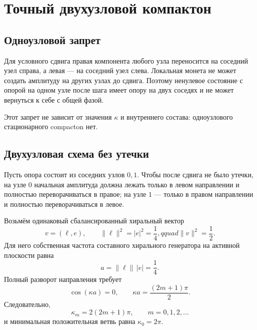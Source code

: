 \chapter{Точный двухузловой компактон}
\label{ch:v6-spectral-transition-discrete-compacton-existence-gate}

\section{Одноузловой запрет}

Для условного сдвига правая компонента любого узла переносится на соседний
узел справа, а левая --- на соседний узел слева. Локальная монета не может
создать амплитуду на других узлах до сдвига. Поэтому ненулевое состояние с
опорой на одном узле после шага имеет опору на двух соседях и не может
вернуться к себе с общей фазой.

Этот запрет не зависит от значения $\kappa$ и внутреннего состава:
одноузлового стационарного compacton нет.

\section{Двухузловая схема без утечки}

Пусть опора состоит из соседних узлов $0,1$. Чтобы после сдвига не было
утечки, на узле $0$ начальная амплитуда должна лежать только в левом
направлении и полностью переворачиваться в правое; на узле $1$ --- только
в правом направлении и полностью переворачиваться в левое.

Возьмём одинаковый сбалансированный хиральный вектор
\begin{equation}
 v=(\ell,e),\qquad
 \|\ell\|^2=|e|^2=\frac14,qquad \|v\|^2=\frac12.
 \label{eq:v6-compacton-local-vector}
\end{equation}
Для него собственная частота составного хирального генератора на активной
плоскости равна
\begin{equation}
 a=\|\ell\|\,|e|=\frac14.
\end{equation}
Полный разворот направления требует
\begin{equation}
 \cos(\kappa a)=0,
 \qquad
 \kappa a=\frac{(2m+1)\pi}{2}.
\end{equation}
Следовательно,
\begin{equation}
 \boxed{\kappa_m=2(2m+1)\pi},\qquad m=0,1,2,\ldots
 \label{eq:v6-compacton-kappa-series}
\end{equation}
и минимальная положительная ветвь равна $\kappa_0=2\pi$.

